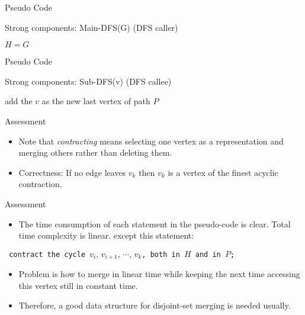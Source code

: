 \documentclass{beamer}
\begin{document}
\begin{frame}{Pseudo Code}
	\SetAlFnt{\normalsize}
	\begin{algorithm}[H]
		\caption{Strong components: Main-DFS(G) (DFS caller)}
		$H=G$\;
	\end{algorithm}
\end{frame}

\begin{frame}{Pseudo Code}
	\SetAlFnt{\normalsize}
	\begin{algorithm}[H]
		\caption{Strong components: Sub-DFS(v) (DFS callee)}
		add the $v$ as the new last vertex of path $P$\;
	\end{algorithm}
\end{frame}

\begin{frame}{Assessment}
	\begin{itemize}
		\item
		Note that \emph{contracting} means selecting one vertex as a representation and \alert{merging} others rather than deleting them.
		\item
		Correctness: If no edge leaves $v_k$ then $v_k$ is a vertex of the finest acyclic contraction.
	\end{itemize}
\end{frame}

\begin{frame}{Assessment}
	\begin{itemize}
		\item
		The time consumption of each statement in the pseudo-code is clear. Total time complexity is linear.
		except this statement:
	\end{itemize}
	\begin{center}
		\texttt{\small 
		contract the cycle $v_i,\, v_{i+1},\,\cdots,\,v_k$, both in $H$ and in $P$;
		}
	\end{center}	
	\begin{itemize}
		\item
		Problem is how to merge in linear time while keeping the next time accessing this vertex still in constant time.
		\item
		Therefore, a good data structure for disjoint-set merging is needed usually.
	\end{itemize}
\end{frame}
\end{document}

